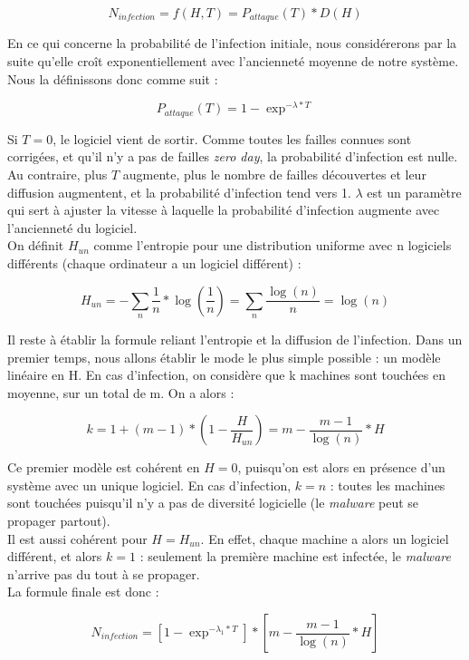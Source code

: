 \[
N_{infection} = f(H,T) = P_{attaque}(T)*D(H)
\]

En ce qui concerne la probabilité de l'infection initiale, nous considérerons par la suite qu'elle croît exponentiellement avec l'ancienneté moyenne de notre système. Nous la définissons donc comme suit :

\[
P_{attaque}(T) =1- \exp^{-\lambda*T}
\]

Si $T=0$, le logiciel vient de sortir. Comme toutes les failles connues sont corrigées, et qu'il n'y a pas de failles \textit{zero day}, la probabilité d'infection est nulle. Au contraire, plus $T$ augmente, plus le nombre de failles découvertes et leur diffusion augmentent, et la probabilité d'infection tend vers 1. $\lambda$ est un paramètre qui sert à ajuster la vitesse à laquelle la probabilité d'infection augmente avec l'ancienneté du logiciel.\\

On définit $H_{un}$ comme l'entropie pour une distribution uniforme avec n logiciels différents (chaque ordinateur a un logiciel différent) :

\[
H_{un} = -\sum_n \frac{1}{n} * \log(\frac{1}{n}) = \sum_n \frac{\log(n)}{n} = \log(n)
\]

Il reste à établir la formule reliant l'entropie et la diffusion de l'infection. Dans un premier temps, nous allons établir le mode le plus simple possible : un modèle linéaire en H. En cas d'infection, on considère que k machines sont touchées en moyenne, sur un total de m. On a alors :

\[
k=1+(m-1)*(1-\frac{H}{H_{un}}) =m-\frac{m-1}{\log(n)}*H
\]

Ce premier modèle est cohérent en $H=0$, puisqu'on est alors en présence d'un système avec un unique logiciel. En cas d'infection, $k=n$ : toutes les machines sont touchées puisqu'il n'y a pas de diversité logicielle (le \textit{malware} peut se propager partout).\\
Il est aussi cohérent pour $H=H_{un}$. En effet, chaque machine a alors un logiciel différent, et alors $k=1$ : seulement la première machine est infectée, le \textit{malware} n'arrive pas du tout à se propager.\\
La formule finale est donc :


\[
N_{infection}=[1-\exp^{-\lambda_1*T}] * [m-\frac{m-1}{\log(n)}*H]
\]

